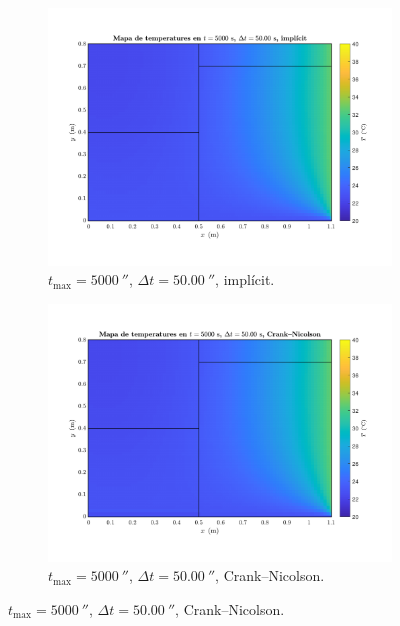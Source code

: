 \begin{figure}[ht]
\begin{subfigure}{.5\textwidth}
		\label{fig:esquema_2}
	\end{subfigure}
	\begin{subfigure}{.5\textwidth}
		\centering
		\includegraphics[width=.95\linewidth]{imagenes/04_analisi_influencia_dades_numeriques/esquema/esquema_3.pdf}
		\vspace{-15pt}
		\caption{$t_\text{max} = 5000 \ \second$, $\Delta t = 50.00 \ \second$, implícit.}
		\label{fig:esquema_3}
	\end{subfigure}%
	\begin{subfigure}{.5\textwidth}
		\centering
		\includegraphics[width=.95\linewidth]{imagenes/04_analisi_influencia_dades_numeriques/esquema/esquema_4.pdf}
		\vspace{-15pt}
		\caption{$t_\text{max} = 5000 \ \second$, $\Delta t = 50.00 \ \second$, Crank--Nicolson.}

\end{subfigure}
\end{figure}

